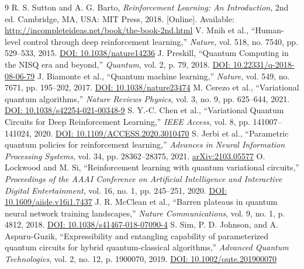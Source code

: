 \documentclass[12pt, a4paper]{article}
\begin{document}
\begingroup
\renewcommand{\section}[2]{}
\begin{thebibliography}{9}
     R. S. Sutton and A. G. Barto, \textit{Reinforcement Learning: An Introduction}, 2nd ed. Cambridge, MA, USA: MIT Press, 2018. [Online]. Available: \url{http://incompleteideas.net/book/the-book-2nd.html}
     V. Mnih et al., ``Human-level control through deep reinforcement learning,'' \textit{Nature}, vol. 518, no. 7540, pp. 529--533, 2015. \href{https://doi.org/10.1038/nature14236}{DOI: 10.1038/nature14236}
     J. Preskill, ``Quantum Computing in the NISQ era and beyond,'' \textit{Quantum}, vol. 2, p. 79, 2018. \href{https://doi.org/10.22331/q-2018-08-06-79}{DOI: 10.22331/q-2018-08-06-79}
     J. Biamonte et al., ``Quantum machine learning,'' \textit{Nature}, vol. 549, no. 7671, pp. 195--202, 2017. \href{https://doi.org/10.1038/nature23474}{DOI: 10.1038/nature23474}
     M. Cerezo et al., ``Variational quantum algorithms,'' \textit{Nature Reviews Physics}, vol. 3, no. 9, pp. 625--644, 2021. \href{https://doi.org/10.1038/s42254-021-00348-9}{DOI: 10.1038/s42254-021-00348-9}
     S. Y.-C. Chen et al., ``Variational Quantum Circuits for Deep Reinforcement Learning,'' \textit{IEEE Access}, vol. 8, pp. 141007--141024, 2020. \href{https://doi.org/10.1109/ACCESS.2020.3010470}{DOI: 10.1109/ACCESS.2020.3010470}
     S. Jerbi et al., ``Parametric quantum policies for reinforcement learning,'' \textit{Advances in Neural Information Processing Systems}, vol. 34, pp. 28362--28375, 2021. \href{https://doi.org/10.48550/arXiv.2103.05577}{arXiv:2103.05577}
     O. Lockwood and M. Si, ``Reinforcement learning with quantum variational circuits,'' \textit{Proceedings of the AAAI Conference on Artificial Intelligence and Interactive Digital Entertainment}, vol. 16, no. 1, pp. 245--251, 2020. \href{https://doi.org/10.1609/aiide.v16i1.7437}{DOI: 10.1609/aiide.v16i1.7437}
     J. R. McClean et al., ``Barren plateaus in quantum neural network training landscapes,'' \textit{Nature Communications}, vol. 9, no. 1, p. 4812, 2018. \href{https://doi.org/10.1038/s41467-018-07090-4}{DOI: 10.1038/s41467-018-07090-4}
     S. Sim, P. D. Johnson, and A. Aspuru-Guzik, ``Expressibility and entangling capability of parameterized quantum circuits for hybrid quantum-classical algorithms,'' \textit{Advanced Quantum Technologies}, vol. 2, no. 12, p. 1900070, 2019. \href{https://doi.org/10.1002/qute.201900070}{DOI: 10.1002/qute.201900070}
\end{thebibliography}
\endgroup
\end{document}
